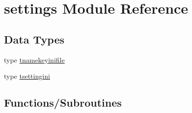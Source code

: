 \hypertarget{namespacesettings}{}\section{settings Module Reference}
\label{namespacesettings}
\subsection*{Data Types}
\begin{DoxyCompactItemize}
\item 
type \mbox{\hyperlink{structsettings_1_1tnamekeyinifile}{tnamekeyinifile}}
\item 
type \mbox{\hyperlink{structsettings_1_1tsettingini}{tsettingini}}
\end{DoxyCompactItemize}
\subsection*{Functions/\+Subroutines}

